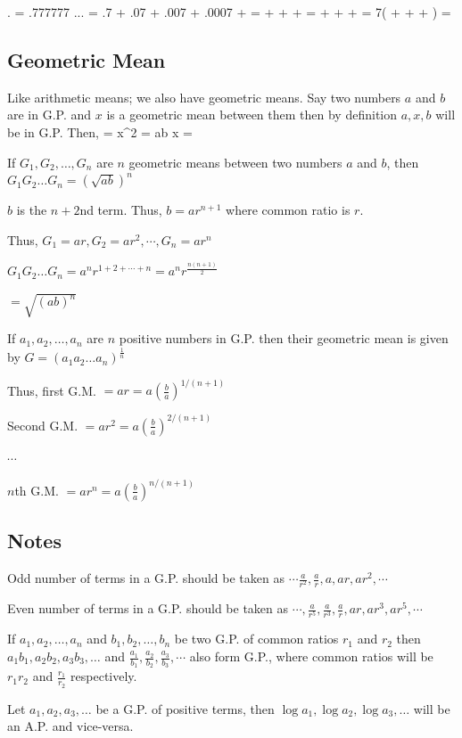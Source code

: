 \startformula . = .777777 ... \infty\stopformula
\startformula = .7 + .07 + .007 + .0007 + \cdots\stopformula
\startformula =  +  +  + \cdots\stopformula
\startformula =  +  +  + \cdots\stopformula
\startformula = 7\left( +  +  + \cdots\right)\stopformula
\startformula = \stopformula

\subsection{Geometric Mean}
Like arithmetic means; we also have geometric means. Say two numbers $a$ and $b$ are in G.P. and $x$ is a geometric mean between
them then by definition $a, x, b$ will be in G.P. Then,
\startformula {} = \stopformula
\startformula \Rightarrow x^2 = ab \Rightarrow x = \stopformula

If $G_1, G_2, \ldots, G_n$ are $n$ geometric means between two numbers $a$ and $b$, then $G_1G_2\ldots G_n = (\sqrt{ab})^n$

 $b$ is the $n + 2$nd term. Thus, $b = ar^{n + 1}$ where common ratio is $r$.

Thus, $G_1 = ar, G_2 = ar^2, \cdots, G_n = ar^n$

$G_1G_2\ldots G_n = a^nr^{1 + 2 + \cdots + n} = a^nr^{\frac{n(n + 1)}{2}}$

$= \sqrt{(ab)^n}$

If $a_1, a_2, \ldots, a_n$ are $n$ positive numbers in G.P. then their geometric mean is given by $G = (a_1a_2\ldots
a_n)^{\frac{1}{n}}$

Thus, first G.M. $= ar = a\left(\frac{b}{a}\right)^{1/(n + 1)}$

Second G.M. $= ar^2 = a\left(\frac{b}{a}\right)^{2/(n + 1)}$

$\cdots$

$n$th G.M. $= ar^{n} = a\left(\frac{b}{a}\right)^{n/(n + 1)}$
\subsection{Notes}
\startitemize[n]
\item Odd number of terms in a G.P. should be taken as $\cdots\frac{a}{r^2}, \frac{a}{r}, a, ar, ar^2, \cdots$
\item Even number of terms in a G.P. should be taken as $\cdots, \frac{a}{r^5}, \frac{a}{r^3}, \frac{a}{r}, ar, ar^3, ar^5, \cdots$
\item If $a_1, a_2, \ldots, a_n$ and $b_1, b_2, \ldots, b_n$ be two G.P. of common ratios $r_1$ and $r_2$ then $a_1b_1, a_2b_2,
  a_3b_3, \ldots$ and $\frac{a_1}{b_1}, \frac{a_2}{b_2}, \frac{a_3}{b_3}, \cdots$ also form G.P., where common ratios will be
  $r_1r_2$ and $\frac{r_1}{r_2}$ respectively.
\item Let $a_1, a_2, a_3, \ldots$ be a G.P. of positive terms, then $\log a_1, \log a_2, \log a_3, \ldots$ will be an A.P. and
  vice-versa.

